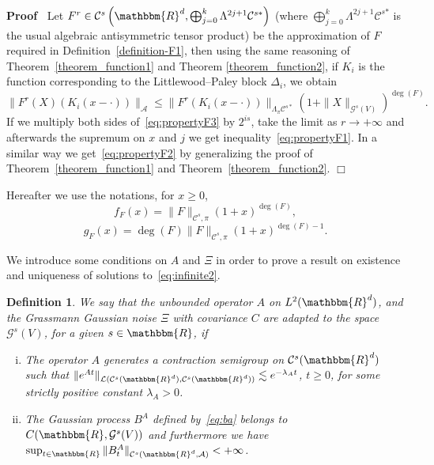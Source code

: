 \documentclass[11pt]{article}
\newcommand{\asterisk}{\mathord{*}}
\newenvironment{enumerateroman}{\begin{enumerate}[i.] }{\end{enumerate}}
\newenvironment{proof}{\noindent\textbf{Proof\ }}{\hspace*{\fill}$\Box$\medskip}
\newtheorem{definition}{Definition}
\begin{document}
\begin{proof}
  Let $F^r \in \mathcal{C}^s \left( \mathbbm{R}^d, \bigoplus_{j = 0}^k
  \Lambda^{2 j + 1} \mathcal{C}^{s \asterisk} \right)$ (where $\bigoplus_{j =
  0}^k \Lambda^{2 j + 1} \mathcal{C}^{s \asterisk}$ is the usual algebraic
  antisymmetric tensor product) be the approximation of $F$ required in
  Definition~\ref{definition-F1}, then using the same reasoning of
  Theorem~\ref{theorem_function1} and Theorem \ref{theorem_function2}, if
  $K_i$ is the function corresponding to the Littlewood--Paley block
  $\Delta_i$, we obtain
  \begin{equation}
    \| F^r (X) (K_i (x - \cdot)) \|_{\mathcal{A}} \leqslant \| F^r (K_i (x -
    \cdot)) \|_{\Lambda_{\pi} \mathcal{C}^{s \ast}} (1 + \| X
    \|_{\mathcal{G}^s (V)})^{\deg (F)} . \label{eq:propertyF3}
  \end{equation}
  If we multiply both sides of~{\eqref{eq:propertyF3}} by $2^{i s}$, take the
  limit as $r \rightarrow + \infty$ and afterwards the supremum on $x$ and $j$
  we get inequality~{\eqref{eq:propertyF1}}. In a similar way we
  get~{\eqref{eq:propertyF2}} by generalizing the proof of
  Theorem~\ref{theorem_function1} and Theorem~\ref{theorem_function2}.
\end{proof}

\begin{remark}
  \label{remark_drift} Hereafter we use the notations, for $x \geqslant 0$,
  \begin{equation}
    f_F (x) = \| F \|_{\mathcal{C}^s, \pi} (1 + x)^{\deg (F)},
  \end{equation}
  \begin{equation}
    g_F (x) = \deg (F) \| F \|_{\mathcal{C}^s, \pi} (1 + x)^{\deg (F) - 1} .
  \end{equation}
\end{remark}

We introduce some conditions on $A$ and $\Xi$ in order to prove a result on
existence and uniqueness of solutions to~{\eqref{eq:infinite2}}.

\begin{definition}
  \label{definition_infinitelinear}We say that the unbounded operator $A$ on
  $L^2 (\mathbbm{R}^d)$, and the Grassmann Gaussian noise $\Xi$ with covariance
  $C$ are adapted to the space $\mathcal{G}^s (V)$, for a given $s \in
  \mathbbm{R}$, if
  \begin{enumerateroman}
    \item The operator $A$ generates a contraction semigroup on $\mathcal{C}^s
    (\mathbbm{R}^d)$ such that $\| e^{A t} \|_{\mathcal{L} (\mathcal{C}^s
    (\mathbbm{R}^d), \mathcal{C}^s (\mathbbm{R}^d))} \lesssim e^{- \lambda_A
    t}$, $t \geqslant 0$, for some strictly positive constant $\lambda_A > 0$.
    
    \item The Gaussian process $B^A$ defined by~{\eqref{eq:ba}} belongs to $C
    (\mathbbm{R}, \mathcal{G}^s (V))$ and furthermore we have $\sup_{t \in
    \mathbbm{R}} \| B_t^A \|_{\mathcal{C}^s (\mathbbm{R}^d, \mathcal{A})} < +
    \infty$.
  \end{enumerateroman}
\end{definition}
\end{document}
